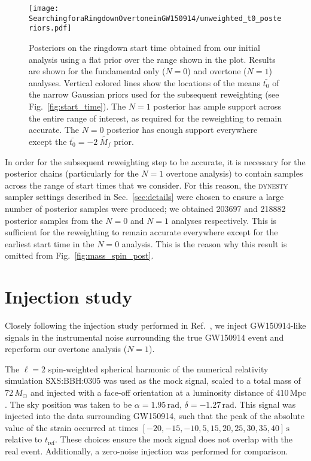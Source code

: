 \begin{figure}[t]
	\centering
	\texttt{[image: SearchingforaRingdownOvertoneinGW150914/unweighted\_t0\_posteriors.pdf]}
	\caption[Posteriors on the GW150914 ringdown start time]{ 
		Posteriors on the ringdown start time obtained from our initial analysis using a flat prior over the range shown in the plot.
		Results are shown for the fundamental only ($N=0$) and overtone ($N=1$) analyses.
		Vertical colored lines show the locations of the means $\bar{t_0}$ of the narrow Gaussian priors used for the subsequent reweighting (see Fig.~\ref{fig:start_time}).
		The $N=1$ posterior has ample support across the entire range of interest, as required for the reweighting to remain accurate.
		The $N=0$ posterior has enough support everywhere except the $\bar{t_0}=-2\ \tilde{M_f}$ prior.
	}
	\label{fig:t0_posterior}
\end{figure}

In order for the subsequent reweighting step to be accurate, it is necessary for the posterior chains (particularly for the $N=1$ overtone analysis) to contain samples across the range of start times that we consider. 
For this reason, the \textsc{dynesty} sampler settings described in Sec.~\ref{sec:details} were chosen to ensure a large number of posterior samples were produced; we obtained 203697 and 218882 posterior samples from the $N=0$ and $N=1$ analyses respectively. 
This is sufficient for the reweighting to remain accurate everywhere except for the earliest start time in the $N=0$ analysis. 
This is the reason why this result is omitted from Fig.~\ref{fig:mass_spin_post}.


\section{Injection study}\label{app:inj}

Closely following the injection study performed in Ref.~\cite{Cotesta:2022pci}, we inject GW150914-like signals in the instrumental noise surrounding the true GW150914 event and reperform our overtone analysis ($N=1$).

The $\ell=2$ spin-weighted spherical harmonic of the numerical relativity simulation SXS:BBH:0305 \cite{Lovelace:2016uwp, sxs_catalog} was used as the mock signal, scaled to a total mass of $72\,M_\odot$ and injected with a face-off orientation at a luminosity distance of $410\,\mathrm{Mpc}$. 
The sky position was taken to be $\alpha = 1.95\,\mathrm{rad}$, $\delta=-1.27\,\mathrm{rad}$.
This signal was injected into the data surrounding GW150914, such that the peak of the absolute value of the strain occurred at times $[-20, -15, -10, 5, 15, 20, 25, 30, 35, 40]\,\mathrm{s}$ relative to $t_\mathrm{ref}$.
These choices ensure the mock signal does not overlap with the real event.
Additionally, a zero-noise injection was performed for comparison. 

